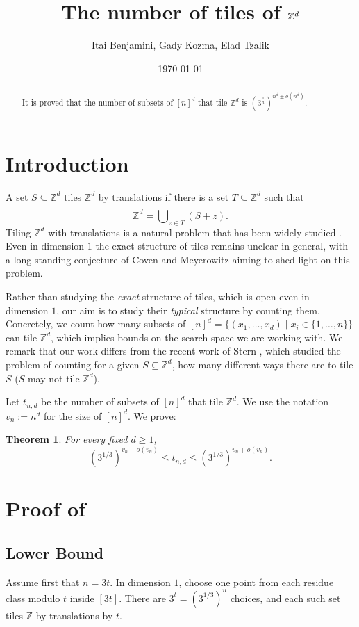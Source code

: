 \documentclass{article}
\title{The number of tiles of $\Z^d$}
\date{\today}
\author{Itai Benjamini, Gady Kozma, Elad Tzalik }
\newcommand{\Z}{\mathbb{Z}}
\newtheorem{theorem}{Theorem}
\begin{document}
\maketitle
\begin{abstract}
    \noindent It is proved that the number of subsets of $[n]^d$ that tile $\Z^d$ is $\left(3^{\frac{1}{3}}\right)^{n^d \pm o(n^d)}$.
\end{abstract}

\section{Introduction}


A set \(S\subseteq \Z^d\) tiles \(\Z^d\) by translations if there is a set \(T\subseteq\Z^d\) such that
\[
    \Z^d=\dot\bigcup_{z\in T}(S+z).
\]
Tiling $\Z^d$
with translations is a natural problem that has been widely studied \cite{COVEN,Wang, Newman,LabaLondner,LabaLondner2,GT}. Even in dimension $1$ the exact structure of tiles remains unclear in general, with a long-standing conjecture of Coven and Meyerowitz \cite{COVEN} aiming to shed light on this problem.

Rather than studying the \emph{exact} structure of tiles, which is open even in dimension \(1\), our aim is to study their \emph{typical} structure by counting them. Concretely, we count how many subsets of $[n]^d = \{(x_1,\ldots,x_d) \mid x_i \in \{1,\ldots,n\} \}$ can tile $\Z^d$, which implies bounds on the search space we are working with. 
We remark that our work differs from the recent work of Stern \cite{Stern}, which studied the problem of counting for a given $S \subseteq \Z^d$, how many different ways there are to tile $S$ ($S$ may not tile $\Z^d$).

Let $t_{n,d}$ be the number of subsets of $[n]^d$ that tile $\Z^d$. We use the notation $v_n:=n^d$ for the size of $[n]^d$. We prove:


\begin{theorem}\label{thm:number-of-tiles}
For every fixed \(d\ge 1\),
\[
    (3^{1/3})^{v_n-o(v_n)}
    \le t_{n,d}\le
    (3^{1/3})^{v_n+o(v_n)} .
\]
\end{theorem}


\section{Proof of }

\subsection{Lower Bound}
Assume first that \(n=3t\). In dimension \(1\), choose one point from each residue class modulo \(t\) inside \([3t]\). There are \(3^t=(3^{1/3})^n\) choices, and each such set tiles \(\Z\) by translations by \(t\).
\end{document}

